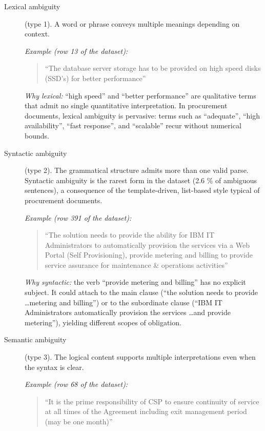 \begin{description}
    \item[Lexical ambiguity] (type 1). A word or phrase conveys multiple meanings depending on context.

    \textit{Example (row 13 of the dataset):}
    \begin{quote}
        ``The database server storage has to be provided on high speed disks (SSD's) for better performance''
    \end{quote}

    \textit{Why lexical:} ``high speed'' and ``better performance'' are qualitative terms that admit no single quantitative interpretation. In procurement documents, lexical ambiguity is pervasive: terms such as ``adequate'', ``high availability'', ``fast response'', and ``scalable'' recur without numerical bounds.

    \item[Syntactic ambiguity] (type 2). The grammatical structure admits more than one valid parse. Syntactic ambiguity is the rarest form in the dataset (2.6 \% of ambiguous sentences), a consequence of the template-driven, list-based style typical of procurement documents.

    \textit{Example (row 391 of the dataset):}
    \begin{quote}
        ``The solution needs to provide the ability for IBM IT Administrators to automatically provision the services via a Web Portal (Self Provisioning), provide metering and billing to provide service assurance for maintenance \& operations activities''
    \end{quote}

    \textit{Why syntactic:} the verb ``provide metering and billing'' has no explicit subject. It could attach to the main clause (``the solution needs to provide \ldots metering and billing'') or to the subordinate clause (``IBM IT Administrators automatically provision the services \ldots and provide metering''), yielding different scopes of obligation.

    \item[Semantic ambiguity] (type 3). The logical content supports multiple interpretations even when the syntax is clear.

    \textit{Example (row 68 of the dataset):}
    \begin{quote}
        ``It is the prime responsibility of CSP to ensure continuity of service at all times of the Agreement including exit management period (may be one month)''
    \end{quote}


\end{description}
